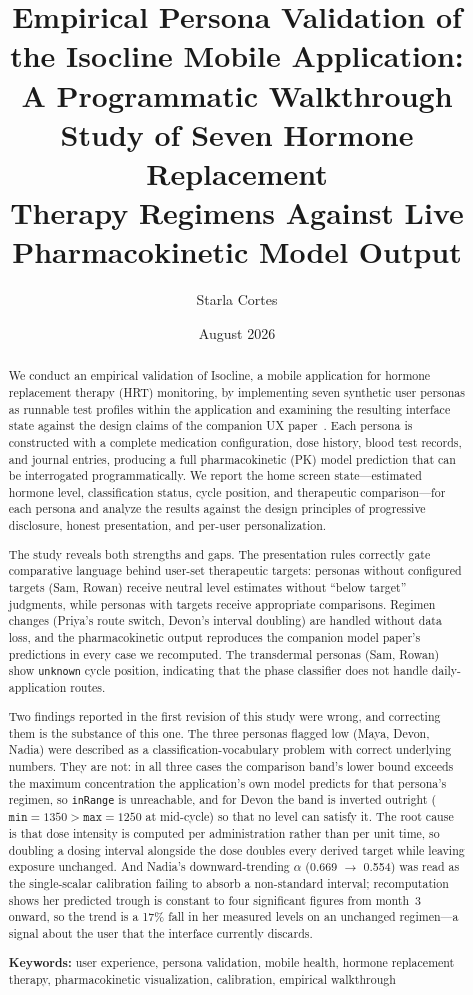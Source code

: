\documentclass[11pt,a4paper]{article}
\title{\textbf{Empirical Persona Validation of the Isocline Mobile Application:}\\[0.3em]
\large A Programmatic Walkthrough Study of Seven Hormone Replacement\\
Therapy Regimens Against Live Pharmacokinetic Model Output}
\author{Starla Cortes}
\date{August 2026}
\newcommand{\code}[1]{\texttt{\small #1}}
\begin{document}
\maketitle

\begin{abstract}
\noindent
We conduct an empirical validation of Isocline, a mobile application for hormone
replacement therapy (HRT) monitoring, by implementing seven synthetic user
personas as runnable test profiles within the application and examining the
resulting interface state against the design claims of the companion UX
paper~\cite{xtux}. Each persona is constructed with a complete medication
configuration, dose history, blood test records, and journal entries,
producing a full pharmacokinetic (PK) model prediction that can be
interrogated programmatically. We report the home screen state---estimated
hormone level, classification status, cycle position, and therapeutic
comparison---for each persona and analyze the results against the design
principles of progressive disclosure, honest presentation, and per-user
personalization.

The study reveals both strengths and gaps. The presentation rules correctly
gate comparative language behind user-set therapeutic targets: personas
without configured targets (Sam, Rowan) receive neutral level estimates
without ``below target'' judgments, while personas with targets receive
appropriate comparisons. Regimen changes (Priya's route switch, Devon's
interval doubling) are handled without data loss, and the pharmacokinetic
output reproduces the companion model paper's predictions in every case we
recomputed. The transdermal personas (Sam, Rowan) show \code{unknown} cycle
position, indicating that the phase classifier does not handle
daily-application routes.

Two findings reported in the first revision of this study were wrong, and
correcting them is the substance of this one. The three personas flagged low
(Maya, Devon, Nadia) were described as a classification-vocabulary problem
with correct underlying numbers. They are not: in all three cases the
comparison band's lower bound exceeds the maximum concentration the
application's own model predicts for that persona's regimen, so
\code{inRange} is unreachable, and for Devon the band is inverted outright
($\texttt{min} = 1350 > \texttt{max} = 1250$ at mid-cycle) so that no level
can satisfy it. The root cause is that dose intensity is computed per
administration rather than per unit time, so doubling a dosing interval
alongside the dose doubles every derived target while leaving exposure
unchanged. And Nadia's downward-trending $\alpha$ (0.669 $\rightarrow$
0.554) was read as the single-scalar calibration failing to absorb a
non-standard interval; recomputation shows her predicted trough is constant
to four significant figures from month~3 onward, so the trend is a 17\% fall
in her measured levels on an unchanged regimen---a signal about the user
that the interface currently discards.

\textbf{Keywords:} user experience, persona validation, mobile health,
hormone replacement therapy, pharmacokinetic visualization, calibration,
empirical walkthrough
\end{abstract}
\end{document}
